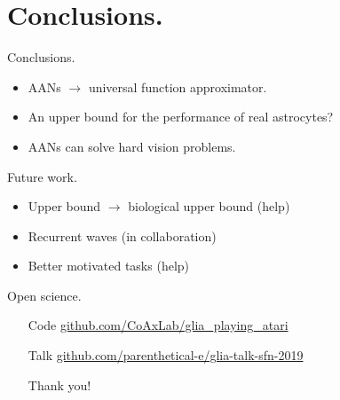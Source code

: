 \documentclass[10pt]{beamer}
\begin{document}
\section[Conclusions.]{Conclusions.}
\begin{frame}[fragile]{Conclusions.}
\begin{itemize}
\item AANs $\rightarrow$ universal function approximator.
\item An \alert{upper bound} for the performance of real astrocytes? 
\item AANs can solve hard vision problems.
\end{itemize}
\end{frame}

\begin{frame}[fragile]{Future work.}
\begin{itemize}
\item Upper bound $\rightarrow$ biological upper bound (\alert{help})
\item Recurrent waves (in collaboration)
\item Better motivated tasks (\alert{help})
\end{itemize}
\end{frame}

\begin{frame}[fragile]{Open science.}
\begin{itemize}
\item[Code] \url{github.com/CoAxLab/glia_playing_atari}
\item[Talk] \url{github.com/parenthetical-e/glia-talk-sfn-2019}
\item[] 
\item[] \alert{Thank you!}
\end{itemize}
\end{frame}


%   
%   

\end{document}

